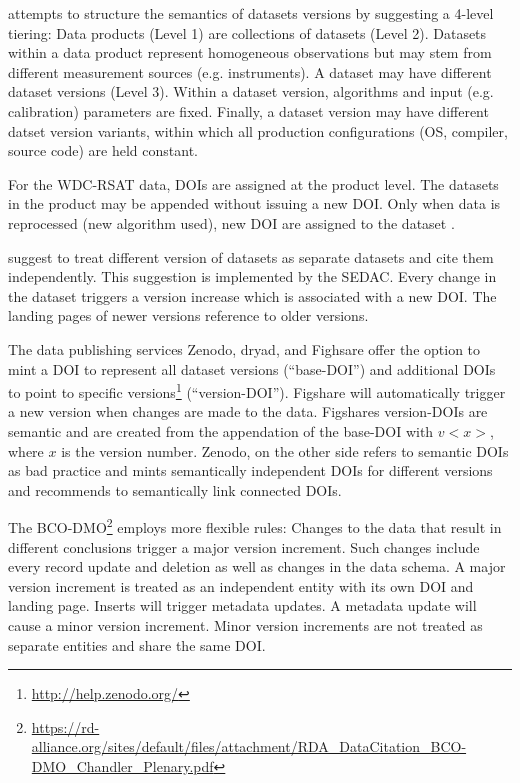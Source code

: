 \documentclass[letterpaper, parskip=half]{scrartcl}
\begin{document}
\cite{Barkstrom2003} attempts to structure the semantics of datasets versions by suggesting a 4-level tiering: Data products (Level 1) are collections of datasets (Level 2). Datasets within a data product represent homogeneous observations but may stem from different measurement sources (e.g. instruments). A dataset may have different dataset versions (Level 3). Within a dataset version, algorithms and input (e.g. calibration) parameters are fixed. Finally, a dataset version may have different datset version variants, within which all production configurations (OS, compiler, source code) are held constant.

For the WDC-RSAT data, \glspl{DOI} are assigned at the product level. The datasets in the product may be appended without issuing a new DOI. Only when data is reprocessed (new algorithm used), new DOI are assigned to the dataset \citep{Huber2015}.

\citep{AltKin07} suggest to treat different version of datasets as separate datasets and cite them independently. This suggestion is implemented by the \gls{SEDAC}\cite{Downs2013}. Every change in the dataset triggers a version increase which is associated with a new \gls{DOI}. The landing pages of newer versions reference to older versions. 

The data publishing services Zenodo, dryad, and Fighsare offer the option to mint a \gls{DOI} to represent all dataset versions (``base-DOI'') and additional \glspl{DOI} to point to specific versions\footnote{\url{http://help.zenodo.org/}} (``version-DOI''). Figshare will automatically trigger a new version when changes are made to the data. Figshares version-\glspl{DOI} are semantic and are created from the appendation of the base-DOI with $v<x>$, where $x$ is the version number. Zenodo, on the other side refers to semantic \glspl{DOI} as bad practice and mints semantically independent \glspl{DOI} for different versions and recommends to semantically link connected \glspl{DOI}.

The \gls{BCO-DMO}\footnote{\url{https://rd-alliance.org/sites/default/files/attachment/RDA_DataCitation_BCO-DMO_Chandler_Plenary.pdf}} employs more flexible rules: Changes to the data that result in different conclusions trigger a major version increment. 
Such changes include every record update and deletion as well as changes in the data schema.
A major version increment is treated as an independent entity with its own \gls{DOI} and landing page. Inserts will trigger metadata updates. A metadata update will cause a minor version increment. Minor version increments are not treated as separate entities and share the same \gls{DOI}.
\end{document}

